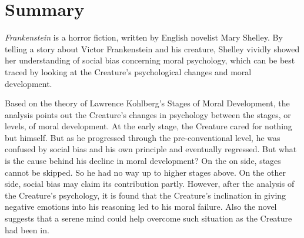 \section{Summary} %
\label{sec:summary_analysis}
\begin{text}

\textit{Frankenstein} is a horror fiction, written by English novelist Mary Shelley. By telling a story about Victor Frankenstein and his creature, Shelley vividly showed her understanding of social bias concerning moral psychology, which can be best traced by looking at the Creature's psychological changes and moral development.

Based on the theory of Lawrence Kohlberg's Stages of Moral Development, the analysis points out the Creature's changes in psychology between the stages, or levels, of moral development. At the early stage, the Creature cared for nothing but himself. But as he progressed through the pre-conventional level, he was confused by social bias and his own principle and eventually regressed. But what is the cause behind his decline in moral development? On the on side, stages cannot be skipped. So he had no way up to higher stages above. On the other side, social bias may claim its contribution partly. However, after the analysis of the Creature's psychology, it is found that the Creature's inclination in giving negative emotions into his reasoning led to his moral failure. Also the novel suggests that a serene mind could help overcome such situation as the Creature had been in.


\end{text}
